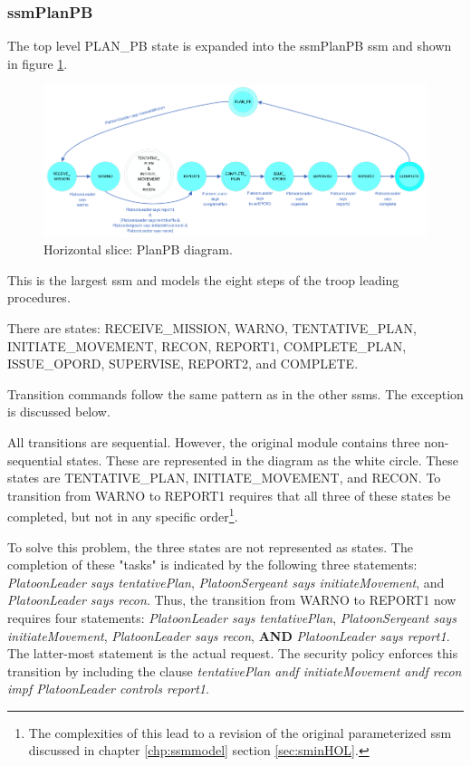 \documentclass[../../main/main.tex]{subfiles}
\begin{document}
\subsubsection{ssmPlanPB}\label{sssec:ssmPlanPB}
The top level PLAN_PB state is expanded into the ssmPlanPB \gls{ssm} and shown in figure \ref{ssmPlanPBDiagram}.

\begin{figure}[h!]
\centering
\includegraphics[width=\textwidth]{../figures/ssmPlanPBDiagram}
\caption{\label{ssmPlanPBDiagram} Horizontal slice: PlanPB diagram.}
\end{figure}

This is the largest \gls{ssm} and models the eight steps of the troop leading procedures.  

There are states: RECEIVE_MISSION, WARNO, TENTATIVE_PLAN, INITIATE_MOVEMENT, RECON, REPORT1, COMPLETE_PLAN, ISSUE_OPORD, SUPERVISE, REPORT2, and COMPLETE.

Transition commands follow the same pattern as in the other \gls{ssm}s.  The exception is discussed below.

All transitions are sequential.  However, the original module contains three non-sequential states.  These are represented in the diagram as the white circle. These states are TENTATIVE_PLAN, INITIATE_MOVEMENT, and RECON.  To transition from WARNO to REPORT1 requires that all three of these states be completed, but not in any specific order\footnote{The complexities of this  lead to a revision of the original parameterized \gls{ssm} discussed in chapter \ref{chp:ssmmodel} section \ref{sec:sminHOL}.}. 

To solve this problem, the three states are not represented as states.  The completion of these "tasks" is indicated by the following three statements: \textit{PlatoonLeader says tentativePlan}, \textit{PlatoonSergeant says initiateMovement}, and \textit{PlatoonLeader says recon}.  Thus, the transition from WARNO to REPORT1 now requires four statements: \textit{PlatoonLeader says tentativePlan}, \textit{PlatoonSergeant says initiateMovement}, \textit{PlatoonLeader says recon}, \textbf{AND} \textit{PlatoonLeader says report1}. The latter-most statement is the actual request.  The security policy enforces this transition by including the clause \textit{tentativePlan andf initiateMovement andf recon impf PlatoonLeader controls report1}.  
\end{document}
